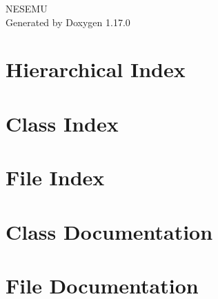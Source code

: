 \documentclass[twoside]{book}
\newcommand{\+}{\discretionary{\mbox{\scriptsize$\hookleftarrow$}}{}{}}
\newcommand{\clearemptydoublepage}{%
    \newpage{\pagestyle{empty}\cleardoublepage}%
  }
\begin{document}
  \raggedbottom
    \hypersetup{pageanchor=false,
                bookmarksnumbered=true,
                pdfencoding=unicode
               }
  \begin{titlepage}
  \vspace*{7cm}
  \begin{center}%
  {\Large NESEMU}\\
  \vspace*{1cm}
  {\large Generated by Doxygen 1.17.0}\\
  \end{center}
  \end{titlepage}
  \clearemptydoublepage
  \tableofcontents
  \clearemptydoublepage
  \hypersetup{pageanchor=true}
\chapter{Hierarchical Index}

\chapter{Class Index}

\chapter{File Index}

\chapter{Class Documentation}







\chapter{File Documentation}







  \backmatter
  \newpage
  \clearemptydoublepage
  \printindex
\end{document}
